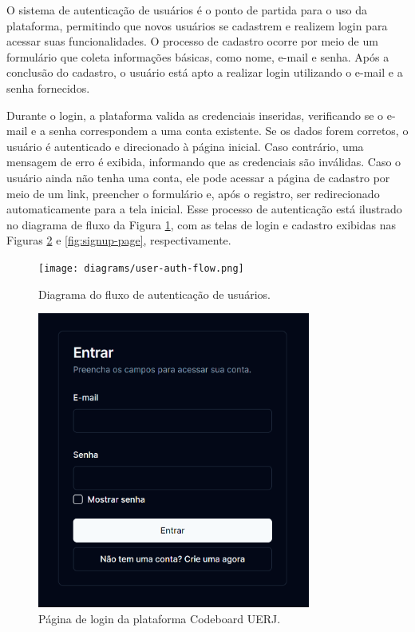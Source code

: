 O sistema de autenticação de usuários é o ponto de partida para o uso da plataforma, permitindo que novos usuários se cadastrem e realizem login para acessar suas funcionalidades. O processo de cadastro ocorre por meio de um formulário que coleta informações básicas, como nome, e-mail e senha. Após a conclusão do cadastro, o usuário está apto a realizar login utilizando o e-mail e a senha fornecidos.

Durante o login, a plataforma valida as credenciais inseridas, verificando se o e-mail e a senha correspondem a uma conta existente. Se os dados forem corretos, o usuário é autenticado e direcionado à página inicial. Caso contrário, uma mensagem de erro é exibida, informando que as credenciais são inválidas. Caso o usuário ainda não tenha uma conta, ele pode acessar a página de cadastro por meio de um link, preencher o formulário e, após o registro, ser redirecionado automaticamente para a tela inicial. Esse processo de autenticação está ilustrado no diagrama de fluxo da Figura \ref{fig:user-auth-flow}, com as telas de login e cadastro exibidas nas Figuras \ref{fig:login-page} e \ref{fig:signup-page}, respectivamente.

\begin{figure}[H]
    \centering
    \texttt{[image: diagrams/user-auth-flow.png]}
    \caption{Diagrama do fluxo de autenticação de usuários.}
    \label{fig:user-auth-flow}
\end{figure}

\begin{figure}[H]
    \centering
    \includegraphics[width=0.8\textwidth]{assets/codeboard/login-page.png}
    \caption{Página de login da plataforma Codeboard UERJ.}
    \label{fig:login-page}
\end{figure}

